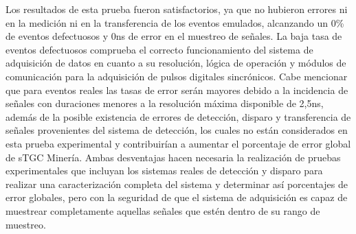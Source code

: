 	Los resultados de esta prueba fueron satisfactorios, ya que no hubieron errores ni en la medición ni en la transferencia de los eventos emulados, alcanzando un 0\% de eventos defectuosos y 0ns de error en el muestreo de señales.%
	La baja tasa de eventos defectuosos comprueba el correcto funcionamiento del sistema de adquisición de datos en cuanto a su resolución, lógica de operación y módulos de comunicación para la adquisición de pulsos digitales sincrónicos. Cabe mencionar que para eventos reales las tasas de error serán mayores debido a la incidencia de señales con duraciones menores a la resolución máxima disponible de 2,5ns, además de la posible existencia de errores de detección, disparo y transferencia de señales provenientes del sistema de detección, los cuales no están considerados en esta prueba experimental y contribuirían a aumentar el porcentaje de error global de sTGC Minería. Ambas desventajas hacen necesaria la realización de pruebas experimentales que incluyan los sistemas reales de detección y disparo para realizar una caracterización completa del sistema y determinar así porcentajes de error globales, pero con la seguridad de que el sistema de adquisición es capaz de muestrear completamente aquellas señales que estén dentro de su rango de muestreo.
	
